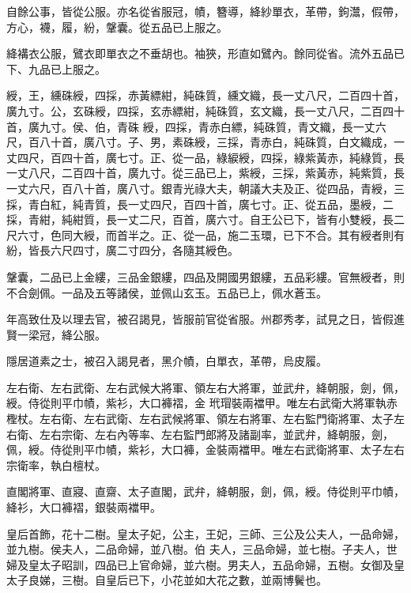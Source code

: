 \begin{pinyinscope}
 自餘公事，皆從公服。亦名從省服冠，幘，簪導，絳紗單衣，革帶，鉤灊，假帶，方心，襪，履，紛，鞶囊。從五品已上服之。



 絳褠衣公服，鷿衣即單衣之不垂胡也。袖狹，形直如鷿內。餘同從省。流外五品已下、九品已上服之。



 綬，王，纁硃綬，四採，赤黃縹紺，純硃質，纁文織，長一丈八尺，二百四十首，廣九寸。公，玄硃綬，四採，玄赤縹紺，純硃質，玄文織，長一丈八尺，二百四十首，廣九寸。侯、伯，青硃
 綬，四採，青赤白縹，純硃質，青文織，長一丈六尺，百八十首，廣八寸。子、男，素硃綬，三採，青赤白，純硃質，白文織成，一丈四尺，百四十首，廣七寸。正、從一品，綠綟綬，四採，綠紫黃赤，純綠質，長一丈八尺，二百四十首，廣九寸。從三品已上，紫綬，三採，紫黃赤，純紫質，長一丈六尺，百八十首，廣八寸。銀青光祿大夫，朝議大夫及正、從四品，青綬，三採，青白紅，純青質，長一丈四尺，百四十首，廣七寸。正、從五品，墨綬，二採，青紺，純紺質，長一丈二尺，百首，廣六寸。自王公已下，皆有小雙綬，長二尺六寸，色同大綬，而首半之。正、從一品，施二玉環，已下不合。其有綬者則有
 紛，皆長六尺四寸，廣二寸四分，各隨其綬色。



 鞶囊，二品已上金縷，三品金銀縷，四品及開國男銀縷，五品彩縷。官無綬者，則不合劍佩。一品及五等諸侯，並佩山玄玉。五品已上，佩水蒼玉。



 年高致仕及以理去官，被召謁見，皆服前官從省服。州郡秀孝，試見之日，皆假進賢一梁冠，絳公服。



 隱居道素之士，被召入謁見者，黑介幘，白單衣，革帶，烏皮履。



 左右衛、左右武衛、左右武候大將軍、領左右大將軍，並武弁，絳朝服，劍，佩，綬。侍從則平巾幘，紫衫，大口褲褶，金
 玳瑁裝兩襠甲。唯左右武衛大將軍執赤檉杖。左右衛、左右武衛、左右武候將軍、領左右將軍、左右監門衛將軍、太子左右衛、左右宗衛、左右內等率、左右監門郎將及諸副率，並武弁，絳朝服，劍，佩，綬。侍從則平巾幘，紫衫，大口褲，金裝兩襠甲。唯左右武衛將軍、太子左右宗衛率，執白檀杖。



 直閣將軍、直寢、直齋、太子直閣，武弁，絳朝服，劍，佩，綬。侍從則平巾幘，絳衫，大口褲褶，銀裝兩襠甲。



 皇后首飾，花十二樹。皇太子妃，公主，王妃，三師、三公及公夫人，一品命婦，並九樹。侯夫人，二品命婦，並八樹。伯
 夫人，三品命婦，並七樹。子夫人，世婦及皇太子昭訓，四品已上官命婦，並六樹。男夫人，五品命婦，五樹。女御及皇太子良娣，三樹。自皇后已下，小花並如大花之數，並兩博鬢也。




\end{pinyinscope}
